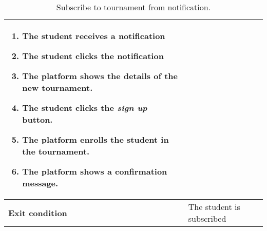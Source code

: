 \begin{enumerate}[label=\textbf{UC\arabic*}:,leftmargin=1.3cm]
\begin{table}[H]
\begin{tabular}{|l|p{11.9cm}|}
\begin{enumerate}[label=\arabic*.]
                              \item The student receives a notification
                              \item The student clicks the notification
                              \item The platform shows the details of the new tournament.
                              \item The student clicks the \emph{sign up} button.
                              \item The platform enrolls the student in the tournament.
                              \item The platform shows a confirmation message.
                        \end{enumerate} \\\hline
                        \textbf{Exit condition}  & The student is subscribed                                                             \\\hline
                  \end{tabular}
                  \caption{Subscribe to tournament from notification.}
                  \label{table:Subscribe to tournament from notification}
            \end{table}


\end{enumerate}
